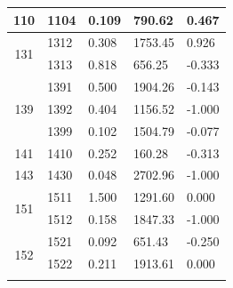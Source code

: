 \documentclass[12pt,a4paper]{article}
\begin{document}
{\begin{longtable}{@{}cllll@{}}
	110                                             & 1104                                         & 0.109                           & 790.62                           & 0.467                            \\ \hline
	\multirow{2}{*}{131}                            & 1312                                         & 0.308                           & 1753.45                          & 0.926                            \\ \cline{2-5} 
	& 1313                                         & 0.818                           & 656.25                           & -0.333                           \\ \hline
	\multirow{3}{*}{139}                            & 1391                                         & 0.500                           & 1904.26                          & -0.143                           \\ \cline{2-5} 
	& 1392                                         & 0.404                           & 1156.52                          & -1.000                           \\ \cline{2-5} 
	& 1399                                         & 0.102                           & 1504.79                          & -0.077                           \\ \hline
	141                                             & 1410                                         & 0.252                           & 160.28                           & -0.313                           \\ \hline
	143                                             & 1430                                         & 0.048                           & 2702.96                          & -1.000                           \\ \hline
	\multirow{2}{*}{151}                            & 1511                                         & 1.500                           & 1291.60                          & 0.000                            \\ \cline{2-5} 
	& 1512                                         & 0.158                           & 1847.33                          & -1.000                           \\ \hline
	\multirow{3}{*}{152}                            & 1521                                         & 0.092                           & 651.43                           & -0.250                           \\ \cline{2-5} 
	& 1522                                         & 0.211                           & 1913.61                          & 0.000                            \\ \cline{2-5} 

\end{longtable}}
\end{document}
